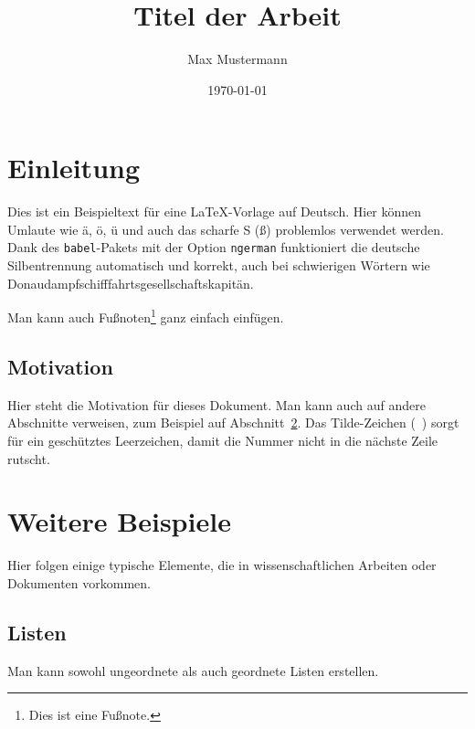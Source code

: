 \documentclass[
    12pt,           %
    a4paper,        %
    oneside         %
]{scrartcl}         %
\title{Titel der Arbeit}
\author{Max Mustermann}
\date{\today} %
\begin{document}
\maketitle

\tableofcontents
\newpage %

\section{Einleitung}
Dies ist ein Beispieltext für eine LaTeX-Vorlage auf Deutsch. Hier können Umlaute wie ä, ö, ü und auch das scharfe S (ß) problemlos verwendet werden.
Dank des \texttt{babel}-Pakets mit der Option \texttt{ngerman} funktioniert die deutsche Silbentrennung automatisch und korrekt, auch bei schwierigen Wörtern wie Donaudampfschifffahrtsgesellschaftskapitän.

Man kann auch Fußnoten\footnote{Dies ist eine Fußnote.} ganz einfach einfügen.

\subsection{Motivation}
Hier steht die Motivation für dieses Dokument. Man kann auch auf andere Abschnitte verweisen, zum Beispiel auf Abschnitt~\ref{sec:beispiele}. Das Tilde-Zeichen (~) sorgt für ein geschütztes Leerzeichen, damit die Nummer nicht in die nächste Zeile rutscht.

\section{Weitere Beispiele}
\label{sec:beispiele} %

Hier folgen einige typische Elemente, die in wissenschaftlichen Arbeiten oder Dokumenten vorkommen.

\subsection{Listen}
Man kann sowohl ungeordnete als auch geordnete Listen erstellen.
\end{document}
